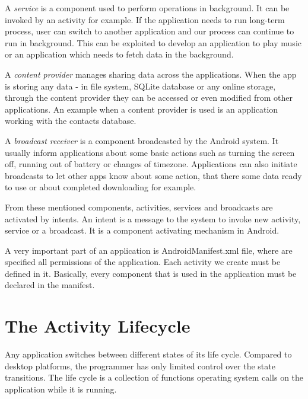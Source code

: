 A \emph{service} is a component used to perform operations in background.
It can be invoked by an activity for example.
If the application needs to run long-term process, user can switch to another application and our process can continue to run in background.
This can be exploited to develop an application to play music or an application which needs to fetch data in the background.

A \emph{content provider} manages sharing data across the applications.
When the app is storing any data - in file system, SQLite database or any online storage, through the content provider they can be accessed or even modified from other applications.
An example when a content provider is used is an application working with the contacts database.

A \emph{broadcast receiver} is a component broadcasted by the Android system.
It usually inform applications about some basic actions such as turning the screen off, running out of battery or changes of timezone.
Applications can also initiate broadcasts to let other apps know about some action, that there some data ready to use or about completed downloading for example.

From these mentioned components, activities, services and broadcasts are activated by intents.
An intent is a message to the system to invoke new activity, service or a broadcast.
It is a component activating mechanism in Android.

A very important part of an application is AndroidManifest\@.xml file, where are specified all permissions of the application.
Each activity we create must be defined in it. Basically, every component that is used in the application must be declared in the manifest.


\section{The Activity Lifecycle}
\label{sec:lifecycle}

Any application switches between different states of its life cycle. 
Compared to desktop platforms, the programmer has only limited control over the state transitions.
The life cycle is a collection of functions operating system calls on the application while it is running.

